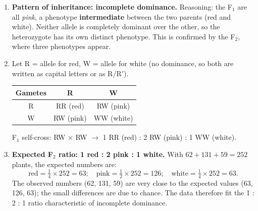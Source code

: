 \documentclass[11pt]{article}
\begin{document}
\begin{corrige}
\begin{enumerate}
\item \textbf{Pattern of inheritance: incomplete dominance.} Reasoning: the F$_1$ are all \emph{pink}, a phenotype \textbf{intermediate} between the two parents (red and white). Neither allele is completely dominant over the other, so the heterozygote has its own distinct phenotype. This is confirmed by the F$_2$, where three phenotypes appear.
\item Let R = allele for red, W = allele for white (no dominance, so both are written as capital letters or as R/R$'$).

\begin{center}
\begin{tabular}{|c|c|c|}
\hline
\rowcolor{popblueL} Gametes & R & W \\
\hline
R & RR (red) & RW (pink) \\
\hline
W & RW (pink) & WW (white) \\
\hline
\end{tabular}
\end{center}

F$_1$ self-cross: RW $\times$ RW $\rightarrow$ 1 RR (red) : 2 RW (pink) : 1 WW (white).
\item \textbf{Expected F$_2$ ratio: 1 red : 2 pink : 1 white.} With $62 + 131 + 59 = 252$ plants, the expected numbers are:
\[ \text{red} = \tfrac{1}{4}\times 252 = 63; \quad \text{pink} = \tfrac{1}{2}\times 252 = 126; \quad \text{white} = \tfrac{1}{4}\times 252 = 63. \]
The observed numbers (62, 131, 59) are very close to the expected values (63, 126, 63); the small differences are due to chance. The data therefore fit the 1 : 2 : 1 ratio characteristic of incomplete dominance.
\end{enumerate}
\end{corrige}
\end{document}
